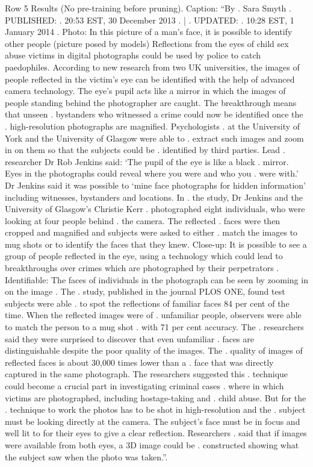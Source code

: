 \begin{table}[H]
\centering
\caption{Row 5 Results (No pre-training before pruning). \ifshowcaption{}Caption: ``By . Sara Smyth . PUBLISHED: . 20:53 EST, 30 December 2013 . | . UPDATED: . 10:28 EST, 1 January 2014 . Photo: In this picture of a man's face, it is possible to identify other people (picture posed by models) Reflections from the eyes of child sex abuse victims in digital photographs could be used by police to catch paedophiles. According to new research from two UK universities, the images of people reflected in the victim's eye can be identified with the help of advanced camera technology. The eye's pupil acts like a mirror in which the images of people standing behind the photographer are caught. The breakthrough means that unseen . bystanders who witnessed a crime could now be identified once the . high-resolution photographs are magnified. Psychologists . at the University of York and the University of Glasgow were able to . extract such images and zoom in on them so that the subjects could be . identified by third parties. Lead . researcher Dr Rob Jenkins said: ‘The pupil of the eye is like a black . mirror. Eyes in the photographs could reveal where you were and who you . were with.' Dr Jenkins said it was possible to ‘mine face photographs for hidden information' including witnesses, bystanders and locations. In . the study, Dr Jenkins and the University of Glasgow's Christie Kerr . photographed eight individuals, who were looking at four people behind . the camera. The reflected . faces were then cropped and magnified and subjects were asked to either . match the images to mug shots or to identify the faces that they knew. Close-up: It is possible to see a group of people reflected in the eye, using a technology which could lead to breakthroughs over crimes which are photographed by their perpetrators . Identifiable: The faces of individuals in the photograph can be seen by zooming in on the image . The . study, published in the journal PLOS ONE, found test subjects were able . to spot the reflections of familiar faces 84 per cent of the time. When the reflected images were of . unfamiliar people, observers were able to match the person to a mug shot . with 71 per cent accuracy. The . researchers said they were surprised to discover that even unfamiliar . faces are distinguishable despite the poor quality of the images. The . quality of images of reflected faces is about 30,000 times lower than a . face that was directly captured in the same photograph. The researchers suggested this . technique could become a crucial part in investigating criminal cases . where in which victims are photographed, including hostage-taking and . child abuse. But for the . technique to work the photos has to be shot in high-resolution and the . subject must be looking directly at the camera. The subject's face must be in focus and well lit to for their eyes to give a clear reflection. Researchers . said that if images were available from both eyes, a 3D image could be . constructed showing what the subject saw when the photo was taken.''.\fi}

\end{table}
